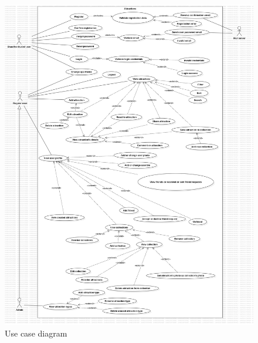 \begin{figure}[!ht]
    \centering
    \includegraphics[width=1\linewidth]{UseCaseDiagram1.png}
    \caption{Use case diagram}
    \label{fig:enter-label}
\end{figure}

\clearpage %

